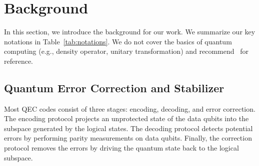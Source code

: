 
\section{Background}
In this section, we introduce the background for our work.
We summarize our key notations in Table~\ref{tab:notations}.
We do not cover the basics of quantum computing (e.g.,  density operator, unitary transformation) and recommend~\cite{nielsen2002quantum} for reference.

\begin{table}[b]
\caption{Notation used in this paper.}\label{tab:notations}
\end{table}

\subsection{Quantum Error Correction and Stabilizer}

Most QEC codes consist of three stages: encoding, decoding, and error correction. The encoding protocol projects an unprotected state of the data qubits into the subspace generated by the logical states. The decoding protocol detects potential errors by performing parity measurements on data qubits. Finally, the correction protocol removes the errors by driving the quantum state back to the logical subspace.



